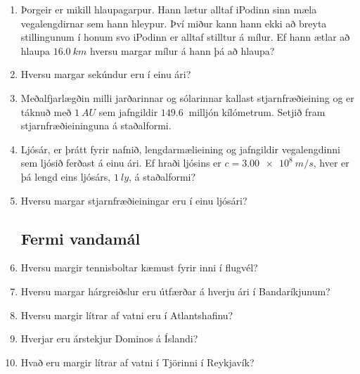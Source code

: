 \ifdefined \wholebook \else\documentclass[oneside]{book}\usepackage{EdlBook}\graphicspath{{figures/}}
\begin{document}
\begin{enumerate}[label = \textbf{Dæmi \thechapter.\arabic*.}]
\item Þorgeir er mikill hlaupagarpur. Hann lætur alltaf iPodinn sinn mæla vegalengdirnar sem hann hleypur. Því miður kann hann ekki að breyta stillingunum í honum svo iPodinn er alltaf stilltur á mílur. Ef hann ætlar að hlaupa $\SI{16.0}{km}$ hversu margar mílur á hann þá að hlaupa?

\item Hversu margar sekúndur eru í einu ári?

\item Meðalfjarlægðin milli jarðarinnar og sólarinnar kallast stjarnfræðieining og er táknuð með $\SI{1}{AU}$ sem jafngildir $\SI{149.6}{}$ milljón kílómetrum. Setjið fram stjarnfræðieininguna á staðalformi.

\item Ljósár, er þrátt fyrir nafnið, lengdarmælieining og jafngildir vegalengdinni sem ljósið ferðast á einu ári. Ef hraði ljósins er $c = \SI{3.00e8}{m/s}$, hver er þá lengd eins ljósárs, $\SI{1}{ly}$, á staðalformi?

\item Hversu margar stjarnfræðieiningar eru í einu ljósári?

\subsection*{Fermi vandamál}

\item Hversu margir tennisboltar kæmust fyrir inni í flugvél?

\item Hversu margar hárgreiðslur eru útfærðar á hverju ári í Bandaríkjunum?

\item Hversu margir lítrar af vatni eru í Atlantshafinu?

\item Hverjar eru árstekjur Dominos á Íslandi?

\item Hvað eru margir lítrar af vatni í Tjörinni í Reykjavík?

\end{enumerate}
\end{document}
